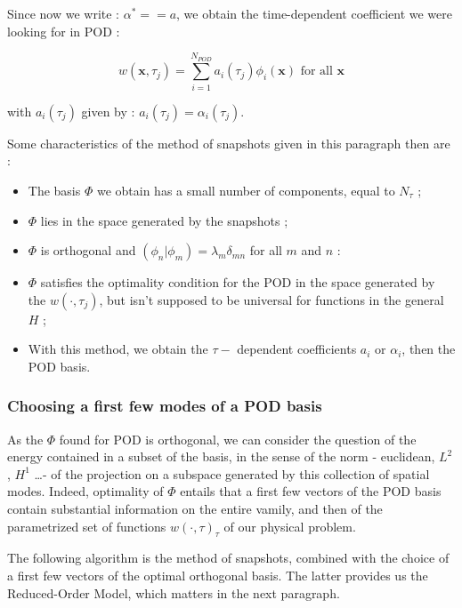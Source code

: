 Since now we write : $\alpha^{\ast}==a$, we obtain the time-dependent coefficient we were looking for in POD :

\[w(\mathbf{x},\tau_j)=\sum\limits_{i=1}^{N_{POD}}a_i(\tau_j)\phi_i(\mathbf{x})\text{ for all $\mathbf{x}$}\]

with $a_i(\tau_j)$ given by : $a_i(\tau_j)=\alpha_i (\tau_j)$.

\ligneinter
Some characteristics of the method of snapshots given in this paragraph then are :

\begin{itemize}
\item The basis $\Phi$ we obtain has a small number of components, equal to $N_{\tau}$ ;
\item $\Phi$ lies in the space generated by the snapshots ;
\item $\Phi$ is orthogonal and $(\phi_n |\phi_m)=\lambda_m\delta_{mn}$ for all $m$ and $n$ :
\item $\Phi$ satisfies the optimality condition for the POD in the space generated by the $w(\cdot , \tau_j)$, but isn't supposed to be universal for functions in the general $H$ ;
\item With this method, we obtain the $\tau-$ dependent coefficients $a_i$ or $\alpha_i$, then the POD basis. 
\end{itemize}

\subsubsection{Choosing a first few modes of a POD basis}

As the $\Phi$ found for POD is orthogonal, we can consider the question of the energy contained in a subset of the basis, %
in the sense of the norm - euclidean, $L^2$, $H^1$ \dots - of the projection on a subspace generated by this collection of spatial modes. %
Indeed, optimality of $\Phi$ entails that a first few vectors of the POD basis contain substantial information on the entire vamily, %
and then of the parametrized set of functions $w(\cdot ,\tau)_{\tau}$ of our physical problem.

\par
The following algorithm is the method of snapshots, combined with the choice of a first few vectors of the optimal orthogonal basis. %
The latter provides us the Reduced-Order Model, which matters in the next paragraph.

